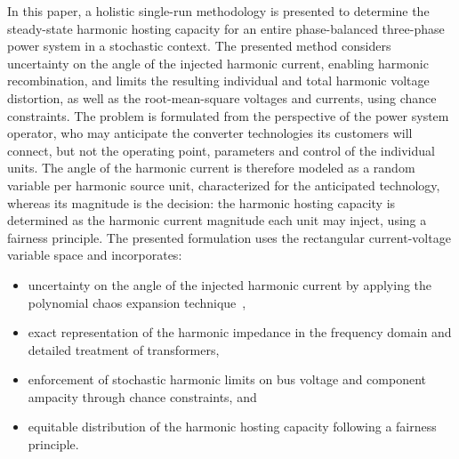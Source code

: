 In this paper, a holistic single-run methodology is presented to determine the steady-state harmonic hosting capacity for an entire phase-balanced three-phase power system in a stochastic context. The presented method considers uncertainty on the angle of the injected harmonic current, enabling harmonic recombination, and limits the resulting individual and total harmonic voltage distortion, as well as the root-mean-square voltages and currents, using chance constraints. The problem is formulated from the perspective of the power system operator, who may anticipate the converter technologies its customers will connect, but not the operating point, parameters and control of the individual units. The angle of the harmonic current is therefore modeled as a random variable per harmonic source unit, characterized for the anticipated technology, whereas its magnitude is the decision: the harmonic hosting capacity is determined as the harmonic current magnitude each unit may inject, using a fairness principle. The presented formulation uses the rectangular current-voltage variable space and incorporates:
\begin{itemize}
    \item uncertainty on the angle of the injected harmonic current by applying the polynomial chaos expansion technique~\cite{sullivan_introduction_2015},
    \item exact representation of the harmonic impedance in the frequency domain and detailed treatment of transformers,
    \item enforcement of stochastic harmonic limits on bus voltage and component ampacity through chance constraints, and
    \item equitable distribution of the harmonic hosting capacity following a fairness principle.
\end{itemize}
